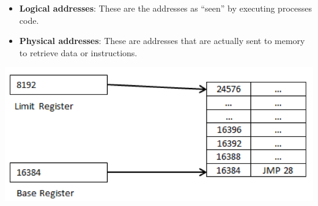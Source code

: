\documentclass[11pt,a4paper]{article}
\theoremstyle{definition}
\newenvironment{myitemize}
{ \begin{itemize}
    \setlength{\itemsep}{5pt}
    \setlength{\parskip}{0pt}
    \setlength{\parsep}{0pt}     }
{ \end{itemize}                  }
\begin{document}
\begin{minipage}{0.4\linewidth}
	\begin{myitemize}
		\item \textbf{Logical addresses}: These are the addresses as “seen” by executing processes code.
		\item \textbf{Physical addresses}: These are addresses that are actually sent to memory to retrieve data or instructions.
	\end{myitemize}
\end{minipage}
\begin{minipage}{0.6\linewidth}
	\includegraphics[width=\linewidth]{m4/logicalAddress}
\end{minipage}
\end{document}
